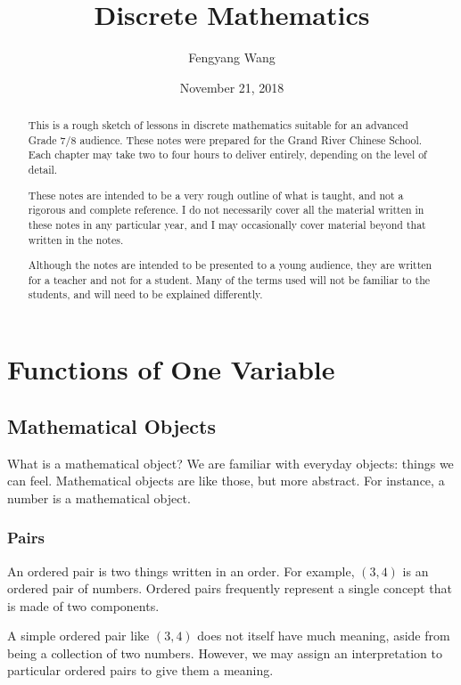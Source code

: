 \documentclass[a4paper,10pt]{report}
\title{Discrete Mathematics}
\author{Fengyang Wang}
\date{November 21, 2018}
\begin{document}
\begin{abstract}
 This is a rough sketch of lessons in discrete mathematics suitable for an advanced Grade
 7/8 audience. These notes were prepared for the Grand River Chinese School. Each chapter
 may take two to four hours to deliver entirely, depending on the level of detail.

 These notes are intended to be a very rough outline of what is taught, and not a rigorous
 and complete reference. I do not necessarily cover all the material written in these notes
 in any particular year, and I may occasionally cover material beyond that written in the
 notes.

 Although the notes are intended to be presented to a young audience, they are written for a
 teacher and not for a student. Many of the terms used will not be familiar to the students,
 and will need to be explained differently.
\end{abstract}

\maketitle

\tableofcontents

\chapter{Functions of One Variable}

\section{Mathematical Objects}

What is a mathematical object? We are familiar with everyday objects: things we can feel.
Mathematical objects are like those, but more abstract. For instance, a number is a
mathematical object.

\subsection{Pairs}

An \gls{ordered pair} is two things written in an order. For example, \((3,
4)\) is an ordered pair of numbers. Ordered pairs frequently represent a single
concept that is made of two components.

A simple ordered pair like \((3, 4)\) does not itself have much meaning, aside
from being a collection of two numbers. However, we may assign an
interpretation to particular ordered pairs to give them a meaning.
\end{document}
